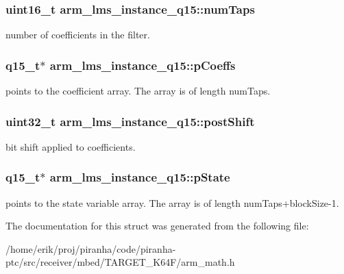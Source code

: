 \subsubsection[{\texorpdfstring{num\+Taps}{numTaps}}]{\setlength{\rightskip}{0pt plus 5cm}uint16\+\_\+t arm\+\_\+lms\+\_\+instance\+\_\+q15\+::num\+Taps}\hypertarget{structarm__lms__instance__q15_a0078e894f805af1b360369e619fb57b3}{}\label{structarm__lms__instance__q15_a0078e894f805af1b360369e619fb57b3}
number of coefficients in the filter. 
\subsubsection[{\texorpdfstring{p\+Coeffs}{pCoeffs}}]{\setlength{\rightskip}{0pt plus 5cm}q15\+\_\+t$\ast$ arm\+\_\+lms\+\_\+instance\+\_\+q15\+::p\+Coeffs}\hypertarget{structarm__lms__instance__q15_a42f95368b94898eb82608e1113d18cab}{}\label{structarm__lms__instance__q15_a42f95368b94898eb82608e1113d18cab}
points to the coefficient array. The array is of length num\+Taps. 
\subsubsection[{\texorpdfstring{post\+Shift}{postShift}}]{\setlength{\rightskip}{0pt plus 5cm}uint32\+\_\+t arm\+\_\+lms\+\_\+instance\+\_\+q15\+::post\+Shift}\hypertarget{structarm__lms__instance__q15_acca5fbaef4a52ae411de24c9a0b929cf}{}\label{structarm__lms__instance__q15_acca5fbaef4a52ae411de24c9a0b929cf}
bit shift applied to coefficients. 
\subsubsection[{\texorpdfstring{p\+State}{pState}}]{\setlength{\rightskip}{0pt plus 5cm}q15\+\_\+t$\ast$ arm\+\_\+lms\+\_\+instance\+\_\+q15\+::p\+State}\hypertarget{structarm__lms__instance__q15_a9a575ff82c1e68cbb583083439260d08}{}\label{structarm__lms__instance__q15_a9a575ff82c1e68cbb583083439260d08}
points to the state variable array. The array is of length num\+Taps+block\+Size-\/1. 

The documentation for this struct was generated from the following file\+:\begin{DoxyCompactItemize}
\item 
/home/erik/proj/piranha/code/piranha-\/ptc/src/receiver/mbed/\+T\+A\+R\+G\+E\+T\+\_\+\+K64\+F/arm\+\_\+math.\+h\end{DoxyCompactItemize}
